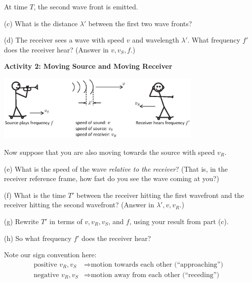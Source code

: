 \vspace{1.0in}


At time $T$, the second wave front is emitted.

(c) What is the distance $\lambda'$ between the first two wave fronts?
\vspace{1.0in}

(d) The receiver sees a wave with speed $v$ and wavelength $\lambda'$.  What frequency $f'$ does the receiver hear? (Answer in $v, v_S, f$.)
\vspace{1.0in}

\pagebreak
\textbf{Activity 2: Moving Source and Moving Receiver}

\begin{center}
\includegraphics[width=0.75\textwidth]{doppler_shift/moving_observer.eps}
\end{center}

Now suppose that you are also moving towards the source with speed $v_R$.  

(e) What is the speed of the wave \textit{relative to the receiver}?  (That is, in the receiver reference frame, how fast do you see the wave coming at you?) 
\vspace{1.0in}

(f) What is the time $T'$ between the receiver hitting the first wavefront and the receiver hitting the second wavefront? (Answer in $\lambda', v, v_R$.)
\vspace{1.0in}

(g) Rewrite $T'$ in terms of $v, v_R, v_S$, and $f$, using your result from part (c).
\vspace{1.0in}

(h) So what frequency $f'$ does the receiver hear?

\vfill

Note our sign convention here:
\begin{align*}
\textrm{positive } v_R, v_S &\Longrightarrow \textrm{motion towards each other (``approaching'')} \\
\textrm{negative } v_R, v_S &\Longrightarrow \textrm{motion away from each other (``receding'')} 
\end{align*}
